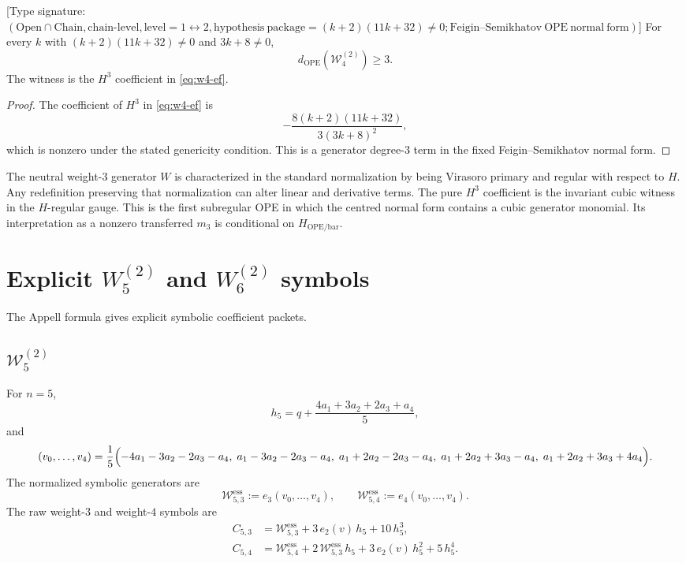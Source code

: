 \begin{theorem}
\label{thm:w4-cubic}
\textup{[}Type signature:
$(\mathrm{Open}\cap\mathrm{Chain},\mathrm{chain\text{-}level},
\mathrm{level}=1\leftrightarrow 2,
\mathrm{hypothesis\ package}=(k+2)(11k+32)\ne 0;
\mathrm{Feigin\text{--}Semikhatov\ OPE\ normal\ form})$\textup{]}
For every $k$ with $(k+2)(11k+32)\neq0$ and $3k+8\neq0$,
\[
d_{\mathrm{OPE}}(\mathcal W_4^{(2)})\ge3.
\]
The witness is the $H^3$ coefficient in \eqref{eq:w4-ef}.
\end{theorem}

\begin{proof}
The coefficient of $H^3$ in \eqref{eq:w4-ef} is
\[
-\frac{8(k+2)(11k+32)}{3(3k+8)^2},
\]
which is nonzero under the stated genericity condition. This is a generator
degree-$3$ term in the fixed Feigin--Semikhatov normal form.
\end{proof}

\begin{remark}
The neutral weight-$3$ generator $W$ is characterized in the standard
normalization by being Virasoro primary and regular with respect to $H$. Any
redefinition preserving that normalization can alter linear and derivative
terms.  The pure $H^3$ coefficient is the invariant cubic witness in the
$H$-regular gauge. This is the first subregular OPE in
which the centred normal form contains a cubic generator monomial.  Its
interpretation as a nonzero transferred $m_3$ is conditional on
$H_{\mathrm{OPE/bar}}$.
\end{remark}

\section{Explicit \texorpdfstring{$W_5^{(2)}$}{W5(2)} and \texorpdfstring{$W_6^{(2)}$}{W6(2)} symbols}

The Appell formula gives explicit symbolic coefficient packets.

\subsection{\texorpdfstring{$\mathcal W_5^{(2)}$}{W5(2)}}

For $n=5$,
\[
h_5=q+\frac{4a_1+3a_2+2a_3+a_4}{5},
\]
and
\[
(v_0,\dots,v_4)
=
\frac{1}{5}
\Bigl(
-4a_1-3a_2-2a_3-a_4,\;
a_1-3a_2-2a_3-a_4,\;
a_1+2a_2-2a_3-a_4,\;
a_1+2a_2+3a_3-a_4,\;
a_1+2a_2+3a_3+4a_4
\Bigr).
\]
The normalized symbolic generators are
\[
\mathcal W^{\mathrm{ess}}_{5,3}:=e_3(v_0,\dots,v_4),
\qquad
\mathcal W^{\mathrm{ess}}_{5,4}:=e_4(v_0,\dots,v_4).
\]
The raw weight-$3$ and weight-$4$ symbols are
\begin{align}
C_{5,3}
&=
\mathcal W^{\mathrm{ess}}_{5,3}
+ 3\,e_2(v)\,h_5
+ 10\,h_5^3,
\label{eq:w5-c3}
\\[4pt]
C_{5,4}
&=
\mathcal W^{\mathrm{ess}}_{5,4}
+ 2\,\mathcal W^{\mathrm{ess}}_{5,3}\,h_5
+ 3\,e_2(v)\,h_5^2
+ 5\,h_5^4.
\label{eq:w5-c4}
\end{align}

